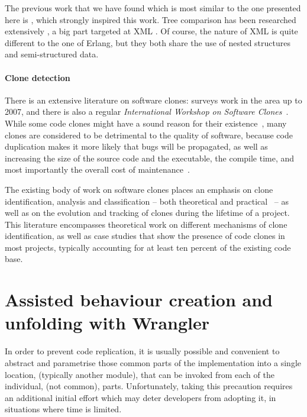 The previous work that we have found which is most similar to the
one presented here is \cite{chawathe1996change}, which strongly
inspired this work. Tree comparison has been researched extensively
\cite{bille2005survey}, a big part targeted at XML \cite{peters2005change}.
Of course, the nature of XML is quite different to the one of Erlang,
but they both share the use of nested structures and semi-structured data.

\paragraph{Clone detection}

There is an extensive literature on software clones: \cite{Roy07Survey} surveys work in the area up to 2007, and there 
is also a regular \emph{International Workshop on Software Clones}~\cite{IWSC10,IWSC11}. While some code clones might 
have a sound reason for their existence~\cite{KasperGodfrey06,Cordy2003}, many clones are considered to be detrimental 
to the quality of software, because code duplication makes it more likely that  bugs will be propagated, as well as 
increasing the size of the source
code and the executable, the compile time, and most importantly the overall cost of maintenance~\cite{Monden02}.

The existing body of work on software clones places an emphasis on clone identification, analysis and classification -- 
both theoretical and practical~\cite{TowardsTaxonomy} -- as well as on the evolution and tracking of clones during the 
lifetime of a project. This literature encompasses theoretical work on different mechanisms of clone identification, as 
well as case studies that  show the presence of code clones in most projects, typically accounting for at least ten 
percent of the existing code base.



\section{Assisted behaviour creation and unfolding with Wrangler}
\label{sec:assisted-creation}

In order to prevent code replication, it is usually possible and
convenient to abstract and parametrise those common parts of the implementation
into a single location, (typically another module), that can be invoked
from each of the individual, (not common), parts. Unfortunately, taking
this precaution requires an additional initial effort which may deter
developers from adopting it, in situations where time is limited.

